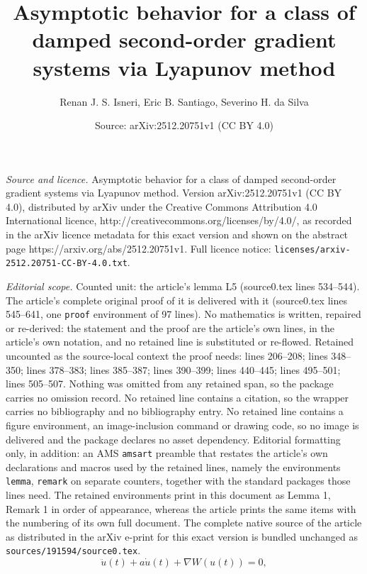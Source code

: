 \documentclass[10pt,a4paper]{amsart}
\title{Asymptotic behavior for a class of damped second-order gradient systems via Lyapunov method}
\author{Renan J. S. Isneri, Eric B. Santiago, Severino H. da Silva}
\date{Source: arXiv:2512.20751v1 (CC BY 4.0)}
\begin{document}
\maketitle

\noindent\emph{Source and licence.} Asymptotic behavior for a class of damped second-order gradient systems via Lyapunov method. Version arXiv:2512.20751v1 (CC BY 4.0), distributed by arXiv under the Creative Commons Attribution 4.0 International licence, http://creativecommons.org/licenses/by/4.0/, as recorded in the arXiv licence metadata for this exact version and shown on the abstract page https://arxiv.org/abs/2512.20751v1. Full licence notice: \texttt{licenses/arxiv-2512.20751-CC-BY-4.0.txt}.\par\smallskip

\noindent\textit{Editorial scope.} Counted unit: the article's lemma L5 (source0.tex lines 534--544). The article's complete original proof of it is delivered with it (source0.tex lines 545--641, one \texttt{proof} environment of 97 lines). No mathematics is written, repaired or re-derived: the statement and the proof are the article's own lines, in the article's own notation, and no retained line is substituted or re-flowed.  Retained uncounted as the source-local context the proof needs: lines 206--208; lines 348--350; lines 378--383; lines 385--387; lines 390--399; lines 440--445; lines 495--501; lines 505--507.  Nothing was omitted from any retained span, so the package carries no omission record.  No retained line contains a citation, so the wrapper carries no bibliography and no bibliography entry.  No retained line contains a figure environment, an image-inclusion command or drawing code, so no image is delivered and the package declares no asset dependency.  Editorial formatting only, in addition: an AMS \texttt{amsart} preamble that restates the article's own declarations and macros used by the retained lines, namely the environments \texttt{lemma}, \texttt{remark} on separate counters, together with the standard packages those lines need.  The retained environments print in this document as Lemma 1, Remark 1 in order of appearance, whereas the article prints the same items with the numbering of its own full document.  The complete native source of the article as distributed in the arXiv e-print for this exact version is bundled unchanged as \texttt{sources/191594/source0.tex}.
\begin{equation}\label{Equation}
	\ddot{u}(t) + a \dot{u}(t) + \nabla W(u(t)) = 0,
\end{equation}
\end{document}
